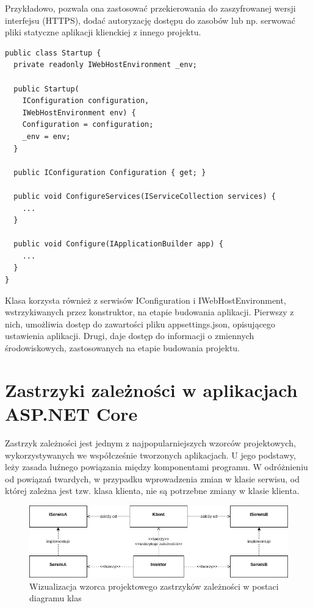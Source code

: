 Przykładowo, pozwala ona zastosować przekierowania do zaszyfrowanej wersji interfejsu (HTTPS), dodać autoryzację dostępu do zasobów lub np. serwować pliki statyczne aplikacji klienckiej z innego projektu. 

\begin{lstlisting}[language=CSharp, caption=Elementy klasy Startup w aplikcji serwerowej, label=lst:startup_server]
public class Startup {
  private readonly IWebHostEnvironment _env;

  public Startup(
    IConfiguration configuration,
    IWebHostEnvironment env) {
    Configuration = configuration;
    _env = env;
  }

  public IConfiguration Configuration { get; }

  public void ConfigureServices(IServiceCollection services) {
    ...
  }

  public void Configure(IApplicationBuilder app) {
    ...
  }
}
\end{lstlisting}

Klasa korzysta również z serwisów IConfiguration i IWebHostEnvironment, wstrzykiwanych przez konstruktor, na etapie budowania aplikacji. Pierwszy z nich, umożliwia dostęp do zawartości pliku appsettings.json, opisującego ustawienia aplikacji. Drugi, daje dostęp do informacji o zmiennych środowiskowych, zastosowanych na etapie budowania projektu.

\section{Zastrzyki zależności w aplikacjach ASP.NET Core}

Zastrzyk zależności jest jednym z najpopularniejszych wzorców projektowych, wykorzystywanych we współcześnie tworzonych aplikacjach. U jego podstawy, leży zasada luźnego powiązania między komponentami programu. W odróżnieniu od powiązań twardych, w przypadku wprowadzenia zmian w klasie serwisu, od której zależna jest tzw. klasa klienta, nie są potrzebne zmiany w klasie klienta.

\begin{figure}[!htbp] 
    \centering
    \includegraphics[width=\textwidth]{img/chapter5/dependency_injection.png}
    \caption{Wizualizacja wzorca projektowego zastrzyków zależności w postaci diagramu klas}
    \label{fig:dependency_injection}
\end{figure}

